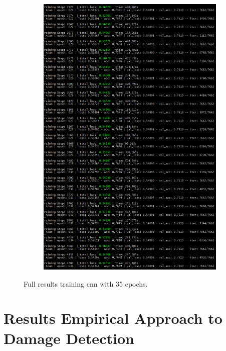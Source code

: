 \begin{figure}[H]
\begin{subfigure}{.475\textwidth}
		\label{fig:NN_R}
	\end{subfigure}
	\begin{subfigure}{.475\textwidth}
		\centering
		\includegraphics[width=.975\linewidth]{figs/TrainingDet1.png}
		\label{fig:NN_R1}
	\end{subfigure}
	\caption{\footnotesize{Full results training \ac{cnn} with 35 epochs.}}
	\label{fig:an1}
\end{figure}

\section{Results Empirical Approach to Damage Detection} \label{an:coh}

